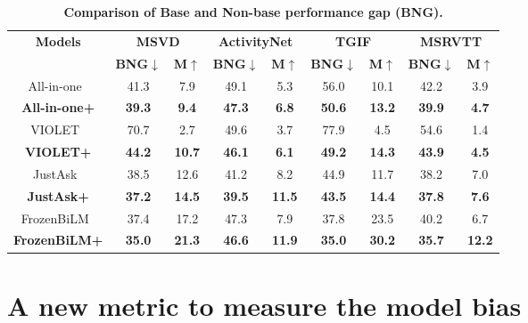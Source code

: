 \documentclass[10pt,twocolumn,letterpaper]{article}
\begin{document}
 \begin{table}[t!]
    \centering
    \setlength{\tabcolsep}{3.5pt}
    \begin{adjustbox}{width=\linewidth}
    \begin{tabular}{c|c c|c c|c c|c c}
        \toprule
        \textbf{Models} & \multicolumn{2}{c|}{\textbf{MSVD}} & \multicolumn{2}{c|}{\textbf{ActivityNet}} & \multicolumn{2}{c|}{\textbf{TGIF}} & \multicolumn{2}{c}{\textbf{MSRVTT}} \\
        & \textbf{BNG}$\downarrow$ & \textbf{M}$\uparrow$ & \textbf{BNG}$\downarrow$ & \textbf{M}$\uparrow$ & \textbf{BNG}$\downarrow$ & \textbf{M}$\uparrow$ & \textbf{BNG}$\downarrow$ & \textbf{M}$\uparrow$ \\
        \midrule
        \midrule
        All-in-one~\cite{wang2022all} & 41.3 & 7.9 & 49.1 & 5.3 & 56.0 & 10.1 & 42.2 & 3.9 \\
        \textbf{All-in-one+} & \textbf{39.3} & \textbf{9.4} & \textbf{47.3} & \textbf{6.8} & \textbf{50.6} & \textbf{13.2} & \textbf{39.9} & \textbf{4.7} \\
        \midrule
        VIOLET~\cite{fu2021violet} & 70.7 & 2.7 & 49.6 & 3.7 & 77.9 & 4.5 & 54.6 & 1.4 \\
        \textbf{VIOLET+} & \textbf{44.2} & \textbf{10.7} & \textbf{46.1} & \textbf{6.1} &  \textbf{49.2} & \textbf{14.3} & \textbf{43.9} & \textbf{4.5} \\
        \midrule
        JustAsk~\cite{yang2021just} & 38.5 & 12.6 & 41.2 & 8.2 & 44.9 & 11.7 & 38.2 & 7.0 \\
        \textbf{JustAsk+} & \textbf{37.2} & \textbf{14.5} & \textbf{39.5} & \textbf{11.5} & \textbf{43.5} & \textbf{14.4} & \textbf{37.8} & \textbf{7.6} \\
        \midrule
        FrozenBiLM~\cite{yang2022zero} & 37.4 & 17.2 & 47.3 & 7.9 & 37.8 & 23.5 & 40.2 & 6.7 \\
        \textbf{FrozenBiLM+} & \textbf{35.0} & \textbf{21.3} & \textbf{46.6} & \textbf{11.9} & \textbf{35.0} & \textbf{30.2} & \textbf{35.7} & \textbf{12.2} \\
        \bottomrule
    \end{tabular}
    \end{adjustbox}
    \caption{\textbf{Comparison of Base and Non-base performance gap (BNG).}
    }
    \label{tab:bng}
\end{table} \section{A new metric to measure the model bias}
\end{document}
